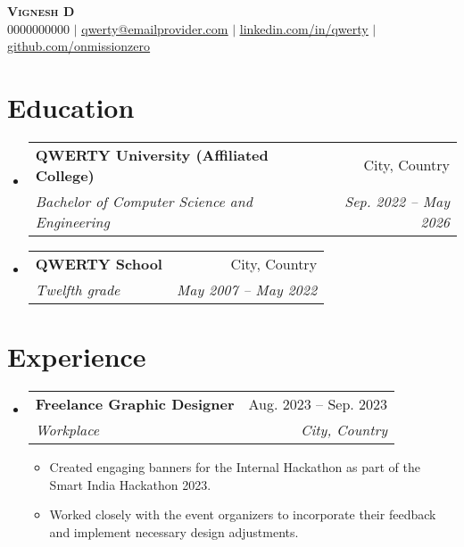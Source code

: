\documentclass[letterpaper,11pt]{article}
\makeatletter
\newcommand{\resumeItem}[1]{
  \item\small{
    {#1 \vspace{-2pt}}
  }
}
\newcommand{\resumeSubheading}[4]{
  \vspace{-2pt}\item
    \begin{tabular*}{0.97\textwidth}[t]{l@{\extracolsep{\fill}}r}
      \textbf{#1} & #2 \\
      \textit{\small#3} & \textit{\small #4} \\
    \end{tabular*}\vspace{-7pt}
}
\newcommand{\resumeSubHeadingListStart}{\begin{itemize}[leftmargin=0.15in, label={}]}
\newcommand{\resumeSubHeadingListEnd}{\end{itemize}}
\newcommand{\resumeItemListStart}{\begin{itemize}}
\newcommand{\resumeItemListEnd}{\end{itemize}\vspace{-5pt}}
\makeatother
\begin{document}

\begin{center}
    \textbf{\Huge \scshape Vignesh D} \\ \vspace{1pt}
    \small 0000000000 $|$ \href{mailto:}{\underline{qwerty@emailprovider.com}} $|$ 
    \href{https://www.linkedin.com/}{\underline{linkedin.com/in/qwerty}} $|$
    \href{https://github.com/onmissionzero}{\underline{github.com/onmissionzero}}
\end{center}


\section{Education}
  \resumeSubHeadingListStart
    \resumeSubheading
      {QWERTY University (Affiliated College)}{City, Country}
      {Bachelor of Computer Science and Engineering}{Sep. 2022 -- May 2026}
    \resumeSubheading
      {QWERTY School}{City, Country}
      {Twelfth grade}{May 2007 -- May 2022}
  \resumeSubHeadingListEnd


\section{Experience}
  \resumeSubHeadingListStart
  
    \resumeSubheading
      {Freelance Graphic Designer}{Aug. 2023 -- Sep. 2023}
      {Workplace}{City, Country}
      \resumeItemListStart
        \resumeItem{Created engaging banners for the Internal Hackathon as part of the Smart India Hackathon 2023.}
        \resumeItem{Worked closely with the event organizers to incorporate their feedback and implement necessary design adjustments.}
    \resumeItemListEnd
  \resumeSubHeadingListEnd


\end{document}
